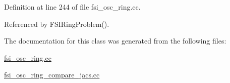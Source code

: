 Definition at line 244 of file fsi\+\_\+osc\+\_\+ring.\+cc.



Referenced by F\+S\+I\+Ring\+Problem().



The documentation for this class was generated from the following files\+:\begin{DoxyCompactItemize}
\item 
\hyperlink{fsi__osc__ring_8cc}{fsi\+\_\+osc\+\_\+ring.\+cc}\item 
\hyperlink{fsi__osc__ring__compare__jacs_8cc}{fsi\+\_\+osc\+\_\+ring\+\_\+compare\+\_\+jacs.\+cc}\end{DoxyCompactItemize}
